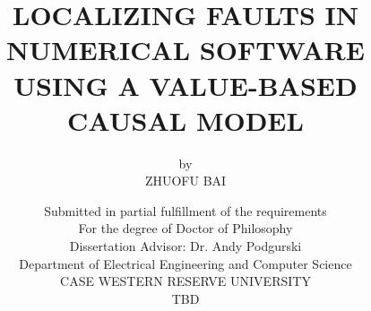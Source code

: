 \documentclass[letterpaper,12pt]{report}
\begin{document}

\title{LOCALIZING FAULTS IN NUMERICAL SOFTWARE USING A VALUE-BASED CAUSAL MODEL}
\author {by\\ZHUOFU BAI}
\date{\vspace{0.8cm}Submitted in partial fulfillment of the requirements\\
For the degree of Doctor of Philosophy\\
\vspace{0.45in}
Dissertation Advisor: Dr. Andy Podgurski\\
\vspace{0.45in}
Department of Electrical Engineering and Computer Science\\
CASE WESTERN RESERVE UNIVERSITY\\
\vspace{0.45in}
TBD}

\maketitle

% 



\setcounter{page}{3}
\tableofcontents
\listoftables
\listoffigures







\newpage
{}







\appendix
\noappendicestocpagenum
\addappheadtotoc

 



\end{document}
